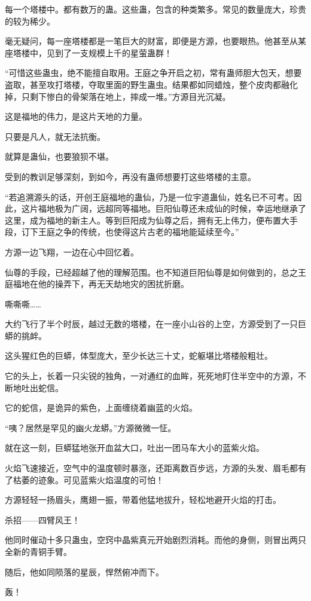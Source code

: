 \begin{this_body}
每一个塔楼中。都有数万的蛊。这些蛊，包含的种类繁多。常见的数量庞大，珍贵的较为稀少。

毫无疑问，每一座塔楼都是一笔巨大的财富，即便是方源，也要眼热。他甚至从某座塔楼中，见到了一支规模上千的星萤蛊群！

“可惜这些蛊虫，绝不能擅自取用。王庭之争开启之初，常有蛊师胆大包天，想要盗取，甚至攻打塔楼，夺取里面的野生蛊虫。结果都如同蜡烛，整个皮肉都融化掉，只剩下惨白的骨架落在地上，摔成一堆。”方源目光沉凝。

这是福地的伟力，是这片天地的力量。

只要是凡人，就无法抗衡。

就算是蛊仙，也要狼狈不堪。

受到的教训足够深刻，到如今，再没有蛊师想要打这些塔楼的主意。

“若追溯源头的话，开创王庭福地的蛊仙，乃是一位宇道蛊仙，姓名已不可考。因此，这片福地极为广阔，远超同等福地。巨阳仙尊还未成仙的时候，幸运地继承了这里，成为福地的新主人。等到巨阳成为仙尊之后，拥有无上伟力，便布置大手段，订下王庭之争的传统，也使得这片古老的福地能延续至今。”

方源一边飞翔，一边在心中回忆着。

仙尊的手段，已经超越了他的理解范围。也不知道巨阳仙尊是如何做到的，总之王庭福地在他的操弄下，再无天劫地灾的困扰折磨。

嘶嘶嘶……

大约飞行了半个时辰，越过无数的塔楼，在一座小山谷的上空，方源受到了一只巨蟒的挑衅。

这头猩红色的巨蟒，体型庞大，至少长达三十丈，蛇躯堪比塔楼般粗壮。

它的头上，长着一只尖锐的独角，一对通红的血眸，死死地盯住半空中的方源，不断地吐出蛇信。

它的蛇信，是诡异的紫色，上面缠绕着幽蓝的火焰。

“咦？居然是罕见的幽火龙蟒。”方源微微一怔。

就在这一刻，巨蟒猛地张开血盆大口，吐出一团马车大小的蓝紫火焰。

火焰飞速接近，空气中的温度顿时暴涨，还距离数百步远，方源的头发、眉毛都有了枯萎的迹象。可见蓝紫火焰温度的可怕！

方源轻轻一扬眉头，鹰翅一振，带着他猛地拔升，轻松地避开火焰的打击。

杀招——四臂风王！

他同时催动十多只蛊虫，空窍中晶紫真元开始剧烈消耗。而他的身侧，则冒出两只全新的青铜手臂。

随后，他如同陨落的星辰，悍然俯冲而下。

轰！


\end{this_body}
